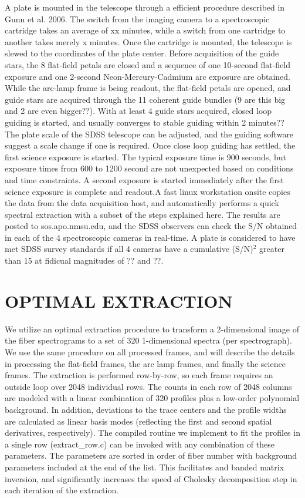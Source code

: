\documentclass[12pt,preprint]{aastex}
\begin{document}
A plate is mounted in the telescope through a efficient procedure described
in Gunn et al. 2006.  The switch from the imaging camera to a spectroscopic
cartridge takes an average of xx minutes, while a switch from one cartridge
to another takes merely x minutes.  Once the cartridge is mounted, the telescope is slewed to the coordinates of the plate center.  
Before acquisition of the guide stars, the 8 flat-field petals are closed and
a sequence of one 10-second flat-field exposure and one 2-second 
Neon-Mercury-Cadmium arc exposure are obtained.  While the arc-lamp frame is
being readout, the flat-field petals are opened, and guide stars are acquired
through the 11 coherent guide bundles (9 are this big and 2 are even bigger??).
With at least 4 guide stars acquired, closed loop guiding is started, and
usually converges to stable guiding within 2 minutes??
The plate scale of the SDSS telescope can be adjusted, and the guiding software
suggest a scale change if one is required.  Once close loop 
guiding has settled, the first science exposure is started.  The typical 
exposure time is 900 seconds, but exposure times from 600 to 1200 second are
not unexpected based on conditions and time constraints.  A second exposure
is started immediately after the first science exposure is complete and readout.A fast linux workstation onsite copies the data from the data acquisition host,
and automatically performs a quick spectral extraction with a subset of the 
steps explained here.  The results are posted to sos.apo.nmsu.edu, and
the SDSS observers can check the S/N obtained in each of the 4 spectroscopic
cameras in real-time.  A plate is considered to have met SDSS survey standards
if all 4 cameras have a cumulative (S/N)$^2$ greater than 15 at 
fidicual magnitudes of ?? and ??.  



\section{OPTIMAL EXTRACTION}
\label{sec_extract}

We utilize an optimal extraction procedure to transform a 2-dimensional image of
the fiber spectrograms to a set of 320 1-dimensional spectra (per spectrograph).
We use the same procedure on all processed frames, 
and will describe the details in processing the flat-field frames, the
arc lamp frames, and finally the science frames.  
The extraction is performed row-by-row, so each frame requires an 
outside loop over 2048 individual rows.
The counts in each row of 2048 columns are modeled with a linear 
combination of 320 profiles plus a low-order
polynomial background.  In addition, deviations to the trace centers and
the profile widths are calculated as linear basis modes (reflecting the first
and second spatial derivatives, respectively).  The compiled routine
we implement to fit the profiles in a single row (extract\_row.c) can
be invoked with any combination of these parameters.  The parameters are
sorted in order of fiber number with background parameters included at the
end of the list.  This facilitates and banded matrix inversion, and 
significantly increases the speed of Cholesky decomposition step in each
iteration of the extraction.
\end{document}
